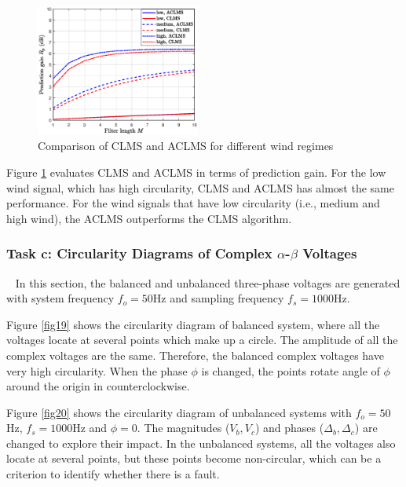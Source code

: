 \documentclass[10pt]{article}
\begin{document}
\begin{figure}[htbp]
    \centering
	\includegraphics[width=0.48\textwidth]{fig/3.1_5.eps}
    \caption{Comparison of CLMS and ACLMS for different wind regimes}
    \label{fig18}
\end{figure}

Figure \ref{fig18} evaluates CLMS and ACLMS in terms of prediction gain. For the 
low wind signal, which has high circularity, CLMS and ACLMS has almost the same performance.
For the wind signals that have low circularity (i.e., medium and high wind), the ACLMS outperforms the 
CLMS algorithm. 

\subsubsection{Task c: Circularity Diagrams of Complex $\alpha$-$\beta$ Voltages}
\ \indent
In this section, the balanced and unbalanced three-phase voltages are generated with 
system frequency $f_o=50$Hz and sampling frequency $f_s=1000$Hz.

Figure \ref{fig19} shows the circularity diagram of balanced system, where all the voltages locate 
at several points which make up a circle. The amplitude of all the complex voltages are the same. 
Therefore, the balanced complex voltages have very high circularity.
When the phase $\phi$ is changed, the points rotate angle of $\phi$ around the origin in counterclockwise. 

Figure \ref{fig20} shows the circularity diagram of unbalanced systems with $f_o=50$Hz, $f_s=1000$Hz and $\phi=0$. 
The magnitudes ($V_b, V_c$) and phases ($\Delta_b, \Delta_c$) are changed to explore their impact.
In the unbalanced systems, all the voltages also locate at several points, but these points 
become non-circular, which can be a criterion to identify whether there is a fault. 
\end{document}
